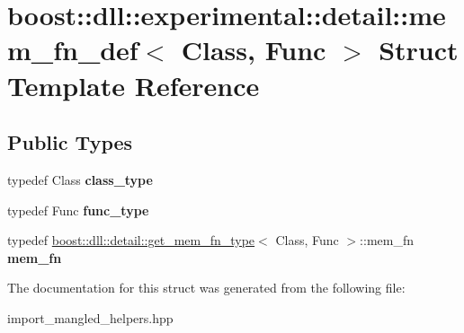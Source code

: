 \hypertarget{a01476}{}\section{boost\+:\+:dll\+:\+:experimental\+:\+:detail\+:\+:mem\+\_\+fn\+\_\+def$<$ Class, Func $>$ Struct Template Reference}
\label{a01476}
\subsection*{Public Types}
\begin{DoxyCompactItemize}
\item 
\mbox{\label{a01476_a85c2e551e2b989cce1ec657f886e3caf}} 
typedef Class {\bfseries class\+\_\+type}
\item 
\mbox{\label{a01476_ae168f1c659ea8b1e71c05132393a0e35}} 
typedef Func {\bfseries func\+\_\+type}
\item 
\mbox{\label{a01476_aab11eba8545f0b80ba59091743cb8774}} 
typedef \hyperlink{a01412}{boost\+::dll\+::detail\+::get\+\_\+mem\+\_\+fn\+\_\+type}$<$ Class, Func $>$\+::mem\+\_\+fn {\bfseries mem\+\_\+fn}
\end{DoxyCompactItemize}


The documentation for this struct was generated from the following file\+:\begin{DoxyCompactItemize}
\item 
import\+\_\+mangled\+\_\+helpers.\+hpp\end{DoxyCompactItemize}
